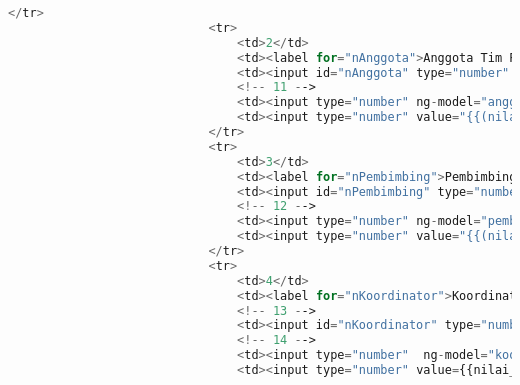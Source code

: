 \begin{lstlisting}[language=PHP,basicstyle=\tiny,caption=skripsi.php]
							</tr>
							<tr>
								<td>2</td>
								<td><label for="nAnggota">Anggota Tim Penguji</label></td>
								<td><input id="nAnggota" type="number" max="100" ng-model="nilai_anggota" class="form-nilai" value="{{nilai_TTLaporanA * TTLaporanA.value / 100 + nilai_KMateriA * KMateriA.value / 100 + nilai_PMateriA * PMateriA.value / 100 + nilai_PresentasiA * presentasiA.value / 100 + nilai_PTujuanA * PTujuanA.value / 100}}" disabled="disabled" /></td>
								<!-- 11 -->
								<td><input type="number" ng-model="anggota.value" ng-init="anggota.value = 35" min="0" max="100" class="form-nilai" name="bobotAnggotaTimPenguji" readonly="readonly" /></td>
								<td><input type="number" value="{{(nilai_TTLaporanA * TTLaporanA.value / 100 + nilai_KMateriA * KMateriA.value / 100 + nilai_PMateriA * PMateriA.value / 100 + nilai_PresentasiA * presentasiA.value / 100 + nilai_PTujuanA * PTujuanA.value / 100) * anggota.value / 100}}" ng-model="total_anggota" class="form-nilai" disabled="disabled" /></td>
							</tr>
							<tr>
								<td>3</td>
								<td><label for="nPembimbing">Pembimbing</label></td>
								<td><input id="nPembimbing" type="number" max="100" ng-model="nilai_pembimbing" class="form-nilai" min=0 value="{{nilai_TTLaporanP * TTLaporanP.value / 100 + nilai_KMateriP * KMateriP.value / 100 + nilai_PMateriP * PMateriP.value / 100 + nilai_PBimbinganP * PBimbinganP.value / 100}}" disabled="disabled" /></td>
								<!-- 12 -->
								<td><input type="number" ng-model="pembimbing.value" ng-init="pembimbing.value = 20" min="0" max="100" class="form-nilai" name="bobotPembimbing" readonly="readonly" /></td>
								<td><input type="number" value="{{(nilai_TTLaporanP * TTLaporanP.value / 100 + nilai_KMateriP * KMateriP.value / 100 + nilai_PMateriP * PMateriP.value / 100 + nilai_PBimbinganP * PBimbinganP.value / 100) * pembimbing.value / 100}}" ng-model="total_pembimbing" class="form-nilai" disabled="disabled" /></td>
							</tr>
							<tr>
								<td>4</td>
								<td><label for="nKoordinator">Koordinator Skripsi</label></td>
								<!-- 13 -->
								<td><input id="nKoordinator" type="number" max="100" ng-model="nilai_koordinator" class="form-nilai" min=0 name="nilaiKoordinatorSkripsi"/></td>
								<!-- 14 -->
								<td><input type="number"  ng-model="koordinator.value" ng-init="koordinator.value = 10" min="0" max="100" class="form-nilai" name="bobotKoordinatorSkripsi" readonly="readonly" /></td>
								<td><input type="number" value={{nilai_koordinator*koordinator.value/100}} ng-model="total_koodinator" class="form-nilai" disabled="disabled" /></td>

\end{lstlisting}
